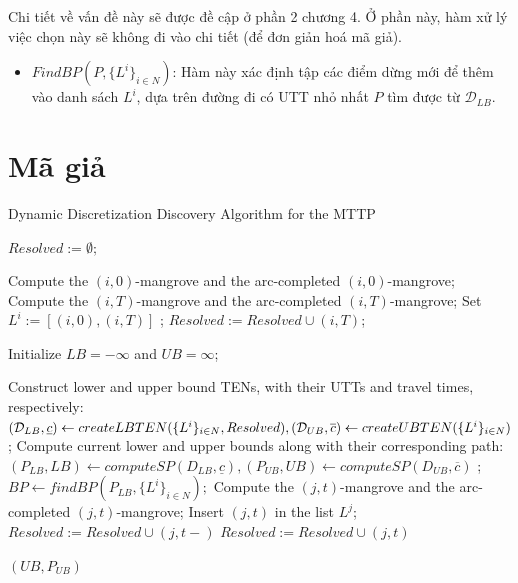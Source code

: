 \documentclass[../main.tex]{subfiles}
\begin{document}
Chi tiết về vấn đề này sẽ được đề cập ở phần 2 chương 4. Ở phần này, hàm
xử lý việc chọn này sẽ không đi vào chi tiết (để đơn giản hoá mã giả).

\begin{itemize}
\tightlist
\item
  \(FindBP(P, \{L^i\}_{i\in N})\): Hàm này xác định tập các điểm dừng
  mới để thêm vào danh sách \(L^i\), dựa trên đường đi có UTT nhỏ nhất
  \(P\) tìm được từ \(\mathcal {D}_{LB}\). 
\end{itemize}

\section{Mã giả}

\begin{algorithm}
\caption{Dynamic Discretization Discovery Algorithm for the MTTP}
\label{algo:2}
\begin{algorithmic}
    
\State $Resolved := \emptyset;$


    \State Compute the $(i, 0)$-mangrove and the arc-completed $(i, 0)$-mangrove; 
    \State Compute the $(i, T)$-mangrove and the arc-completed $(i, T)$-mangrove; 
    \State Set $L^i := [(i, 0), (i, T )]$ ;
    \State $Resolved := Resolved \cup {(i, T )}$;
\EndFor

\State Initialize $LB = −\infty$ and $UB = \infty$; 

    \State Construct lower and upper bound TENs, with their UTTs and travel times, respectively:
        \State  $(\mathcal{D}_{LB},\underline{c}) \gets createLBTEN(\{L^i\}_{i\in N},Resolved), \\(\mathcal{D}_{UB},\overline{c}) \gets createUBTEN(\{L^i\}_{i\in N})$ ;
    \State Compute current lower and upper bounds along with their corresponding path:
        \State  $(P_{LB},LB)\gets computeSP(D_{LB},\underline{c}),(P_{UB},UB) \gets computeSP(D_{UB},\overline{c})$ ;
    \State $BP \gets findBP(P_{LB},\{L^i\}_{i\in N}) ;$
    \EndFor 
        \State Compute the $(j, t)$-mangrove and the arc-completed $(j, t)$-mangrove;
        \State Insert $(j,t)$ in the list $L^j$;
        \State          $Resolved := Resolved \cup {(j, t−)}$
        \EndIf
        \State  $Resolved := Resolved \cup {(j, t)}$ 

        \EndIf  
\EndWhile

\Return $(UB,P_{UB})$

    \end{algorithmic}
\end{algorithm}

\backmatter
\end{document}
